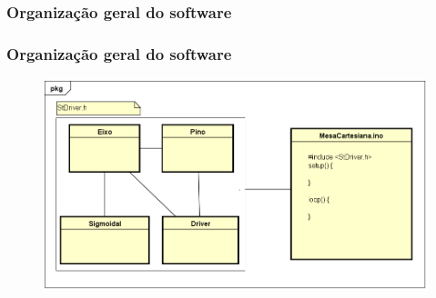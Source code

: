 \subsubsection{Organização geral do software}

\begin{frame}
\frametitle{Organização geral do software}

\begin{figure}
\centering
\includegraphics[scale = 0.4]{figs/orgsoftware}
\end{figure}

\end{frame}
